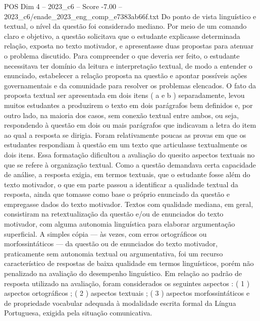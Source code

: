 \begin{textsample}{POS Dim 4 – 2023\_c6 – Score -7.00 – 2023\_c6/enade\_2023\_eng\_comp\_e7383ab66f.txt}
Do ponto de vista linguístico e textual, o nível da questão foi considerado mediano.
Por meio de um comando claro e objetivo, a questão solicitava que o estudante explicasse determinada relação, exposta no texto motivador, e apresentasse duas propostas para atenuar o problema discutido.
Para compreender o que deveria ser feito, o estudante necessitava ter domínio da leitura e interpretação textual, de modo a entender o enunciado, estabelecer a relação proposta na questão e apontar possíveis ações governamentais e da comunidade para resolver os problemas elencados.
O fato da proposta textual ser apresentada em dois itens ( a e b ) separadamente, levou muitos estudantes a produzirem o texto em dois parágrafos bem definidos e, por outro lado, na maioria dos casos, sem conexão textual entre ambos, ou seja, respondendo à questão em dois ou mais parágrafos que indicavam a letra do item ao qual a resposta se dirigia.
Foram relativamente poucas as provas em que os estudantes respondiam à questão em um texto que articulasse textualmente os dois itens.
Essa formatação dificultou a avaliação do quesito aspectos textuais no que se refere à organização textual.
Como a questão demandava certa capacidade de análise, a resposta exigia, em termos textuais, que o estudante fosse além do texto motivador, o que em parte passou a identificar a qualidade textual da resposta, ainda que tomasse como base o próprio enunciado da questão e empregasse dados do texto motivador.
Textos com qualidade mediana, em geral, consistiram na retextualização da questão e/ou de enunciados do texto motivador, com alguma autonomia linguística para elaborar argumentação superficial.
A simples cópia — às vezes, com erros ortográficos ou morfossintáticos — da questão ou de enunciados do texto motivador, praticamente sem autonomia textual ou argumentativa, foi um recurso característico de respostas de baixa qualidade em termos linguísticos, porém não penalizado na avaliação do desempenho linguístico.
Em relação ao padrão de resposta utilizado na avaliação, foram considerados os seguintes aspectos : ( 1 ) aspectos ortográficos ; ( 2 ) aspectos textuais ; ( 3 ) aspectos morfossintáticos e de propriedade vocabular adequada à modalidade escrita formal da Língua Portuguesa, exigida pela situação comunicativa.

\end{textsample}
